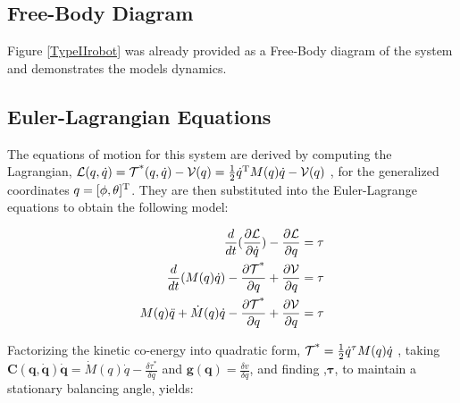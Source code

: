 \documentclass{UoNMCHA}
\numberwithin{equation}{section}
\begin{document}
\subsection{Free-Body Diagram}

Figure \ref{TypeIIrobot} was already provided as a Free-Body diagram of the system and demonstrates the models dynamics.

\subsection{Euler-Lagrangian Equations}

The equations of motion for this system are derived by computing the Lagrangian, $\mathcal{L}(q,\dot{q}) = \mathcal{T\textsuperscript{*}}(q,\dot{q}) - \mathcal{V}(q) = \frac{1}{2}\dot{q}\textsuperscript{T}M(q)\dot{q} - \mathcal{V}(q)$ ,  for the generalized coordinates $q = [\phi, \theta]\textsuperscript{T}$. They are then substituted into the Euler-Lagrange equations to obtain the following model:

\begin{equation}\label{Lagrangian}
\begin{split}
\frac{d}{dt}(\frac{\partial\mathcal{L}}{\partial\dot{q}}) - \frac{\partial\mathcal{L}}{\partial{q}} = \tau \\
\frac{d}{dt}(M(q)\dot{q}) - \frac{\partial\mathcal{T\textsuperscript{*}}}{\partial{q}}  + \frac{\partial\mathcal{V}}{\partial{q}} = \tau \\
M(q)\ddot{q} + \dot{M}(q)\dot{q} - \frac{\partial\mathcal{T\textsuperscript{*}}}{\partial{q}}  + \frac{\partial\mathcal{V}}{\partial{q}} = \tau \\ 
\end{split}
\end{equation}



Factorizing the kinetic co-energy into quadratic form,
 $\mathbf{\mathcal{T\textsuperscript{*}}}= \frac{1}{2}\dot{q}^{\tau}M(q)\dot{q}$ , taking 
  $\mathbf{C(q,\dot{q})\dot{q}} = \dot{M}(q)\dot{q}-\frac{\delta\tau^*}{\delta q}$
   and $\mathbf{g(q)}=\frac{\delta v}{\delta q}$, and finding ,$\mathbf{\tau}$, to maintain a stationary balancing angle, yields:
\end{document}
